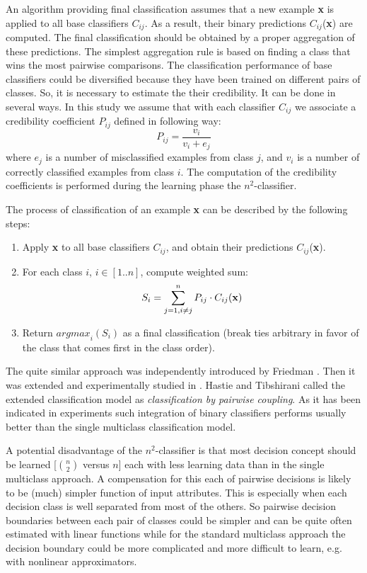 \documentclass{article}
\begin{document}
An algorithm providing final classification assumes that a new example {\bf x%
} is applied to all base classifiers $C_{ij}$. As a result, their binary
predictions $C_{ij}$({\bf x}) are computed. The final classification should
be obtained by a proper aggregation of these predictions. The simplest
aggregation rule is based on finding a class that wins the most pairwise
comparisons. The classification performance of base classifiers could be
diversified because they have been trained on different pairs of classes.
So, it is necessary to estimate the their credibility. It can be done in
several ways. In this study we assume that with each classifier $C_{ij}$ we
associate a credibility coefficient $P_{ij}$ defined in following way:
\[
P_{ij}=\frac{v_i}{v_i+e_j}
\]
where $e_j$ is a number of misclassified examples from class $j$, and $v_i$
is a number of correctly classified examples from class $i$. The computation
of the credibility coefficients is performed during the learning phase the $%
n^2$-classifier.

\noindent The process of classification of an example {\bf x} can be
described by the following steps:

\begin{enumerate}
\item  Apply {\bf x} to all base classifiers $C_{ij}$, and obtain their
predictions $C_{ij}$({\bf x}).

\item  For each class $i$, $i\in [1..n]$, compute weighted sum:
\[
S_{i}=\sum_{j=1,i\neq j}^{n}P_{ij}\cdot C_{ij}({\bf x})
\]

\item  Return ${argmax}_{i}(S_{i})$ as a final classification (break ties
arbitrary in favor of the class that comes first in the class order).
\end{enumerate}

The quite similar approach was independently introduced by
Friedman \cite {Friedman}. Then it was extended and experimentally
studied in \cite{Hastie}. Hastie and Tibshirani called the
extended  classification model as {\em classification by pairwise
coupling}. As it has been indicated in experiments
\cite{Friedman,Hastie} such integration of binary classifiers
performs usually better than the single multiclass classification
model.

A potential disadvantage of the $n^{2}$-classifier is that most
decision concept should be learned [${n \choose 2}$ versus $n$]
each with less learning data than in the single multiclass
approach. A compensation for this each of pairwise decisions is
likely to be (much) simpler function of input attributes. This is
especially when each decision class is well separated from most of
the others. So pairwise decision boundaries between each pair of
classes could be simpler and can be quite often estimated with
linear functions while for the standard multiclass approach the
decision boundary could be more complicated and more difficult to
learn, e.g. with nonlinear approximators.
\end{document}
